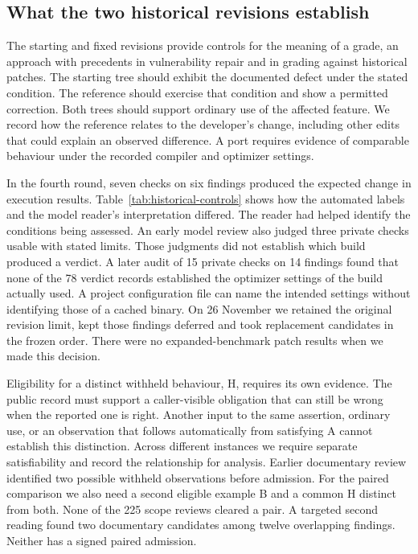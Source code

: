 \subsection{What the two historical revisions establish}

The starting and fixed revisions provide controls for the meaning of a grade, an approach with precedents in vulnerability repair and in grading against historical patches. The starting tree should exhibit the documented defect under the stated condition. The reference should exercise that condition and show a permitted correction. Both trees should support ordinary use of the affected feature. We record how the reference relates to the developer's change, including other edits that could explain an observed difference. A port requires evidence of comparable behaviour under the recorded compiler and optimizer settings.~\cite{bui2022vul4j,ye2021assessment}

In the fourth round, seven checks on six findings produced the expected change in execution results. Table~\ref{tab:historical-controls} shows how the automated labels and the model reader's interpretation differed. The reader had helped identify the conditions being assessed. An early model review also judged three private checks usable with stated limits. Those judgments did not establish which build produced a verdict. A later audit of 15 private checks on 14 findings found that none of the 78 verdict records established the optimizer settings of the build actually used. A project configuration file can name the intended settings without identifying those of a cached binary. On 26 November we retained the original revision limit, kept those findings deferred and took replacement candidates in the frozen order. There were no expanded-benchmark patch results when we made this decision.

\begin{table}[tbp]
\centering
\caption{Seven fourth-round checks on six findings. Execution, automatic interpretation, and model reading describe the same checks on the historical revisions.}
\label{tab:historical-controls}
\small

\end{table}

Eligibility for a distinct withheld behaviour, H, requires its own evidence. The public record must support a caller-visible obligation that can still be wrong when the reported one is right. Another input to the same assertion, ordinary use, or an observation that follows automatically from satisfying A cannot establish this distinction. Across different instances we require separate satisfiability and record the relationship for analysis. Earlier documentary review identified two possible withheld observations before admission. For the paired comparison we also need a second eligible example B and a common H distinct from both. None of the 225 scope reviews cleared a pair. A targeted second reading found two documentary candidates among twelve overlapping findings. Neither has a signed paired admission.

